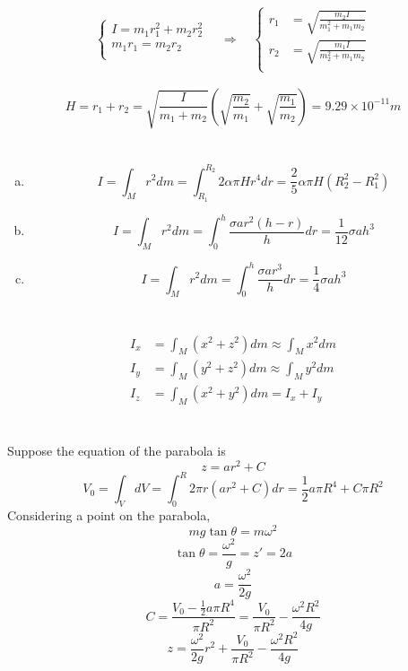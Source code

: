 \documentclass{article}
\begin{document}
\section{}
\begin{eqnarray*}
\left\{
\begin{array}{l}
I=m_1r_1^2+m_2r_2^2\\
m_1r_1=m_2r_2\\
\end{array}
\right.\quad\Longrightarrow\quad
\left\{
\begin{array}{ll}
r_1&=\sqrt{\frac{m_2I}{m_1^2+m_1m_2}}\\
r_2&=\sqrt{\frac{m_1I}{m_2^2+m_1m_2}}\\
\end{array}
\right.
\end{eqnarray*} 

$$H=r_1+r_2=\sqrt{\frac{I}{m_1+m_2}}\left(\sqrt{\frac{m_2}{m_1}}+\sqrt{\frac{m_1}{m_2}}\right)=9.29\times10^{-11}m$$

\section{}
\begin{enumerate}[(a)]
\item
	$$I=\int_M r^2dm=\int_{R_1}^{R_2}2\alpha\pi Hr^4dr=\frac{2}{5}\alpha\pi H(R_2^2-R_1^2)$$
	
\item
	$$I=\int_M r^2dm=\int_0^h\frac{\sigma ar^2(h-r)}{h}dr=\frac{1}{12}\sigma ah^3$$

\item	
	$$I=\int_M r^2dm=\int_0^h\frac{\sigma ar^3}{h}dr=\frac{1}{4}\sigma ah^3$$

\end{enumerate}

\section{}

\begin{align*}
I_x&=\int_M(x^2+z^2)dm\approx\int_Mx^2dm\\
I_y&=\int_M(y^2+z^2)dm\approx\int_My^2dm\\
I_z&=\int_M(x^2+y^2)dm=I_x+I_y
\end{align*}

\section{}
Suppose the equation of the parabola is
$$z=ar^2+C$$
$$V_0=\int_VdV=\int_0^R2\pi r(ar^2+C)dr=\frac{1}{2}a\pi R^4+C\pi R^2$$
Considering a point on the parabola,
$$mg\tan\theta=m\omega^2$$
$$\tan\theta=\frac{\omega^2}{g}=z'=2a$$
$$a=\frac{\omega^2}{2g}$$
$$C=\frac{V_0-\frac{1}{2}a\pi R^4}{\pi R^2}=\frac{V_0}{\pi R^2}-\frac{\omega^2R^2}{4g}$$
$$z=\frac{\omega^2}{2g}r^2+\frac{V_0}{\pi R^2}-\frac{\omega^2R^2}{4g}$$
\end{document}
